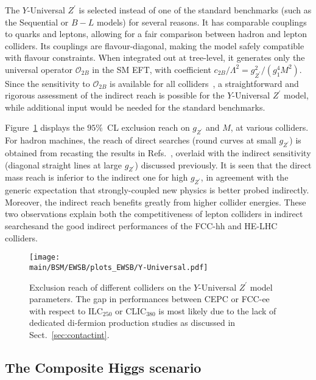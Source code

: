 \documentclass[../report.tex]{subfiles}
\providecommand{\main}{..}
\begin{document}
The $Y$-Universal $Z^\prime$ is selected instead of one of the standard benchmarks (such as the Sequential or $B-L$ models) for several reasons. It has comparable couplings to quarks and leptons, allowing for a fair comparison between hadron and lepton colliders. Its couplings are flavour-diagonal, making the model safely compatible with flavour constraints. When integrated out at tree-level, it generates only the universal operator ${\mathcal{O}}_{2B}$ in the SM EFT, with coefficient ${c_{2B}}/{\Lambda^2}={g_{Z^\prime}^2}/{(g_1^4 M^2)}$.  Since the sensitivity to ${\mathcal{O}}_{2B}$ is available for all colliders~\cite{deBlas:2019rxi}, a straightforward and rigorous assessment of the indirect reach is possible for the $Y$-Universal $Z^\prime$ model, while additional input would be needed for the standard benchmarks.

Figure~\ref{fig:Universal_Zp} displays the $95\%$~CL exclusion reach on $g_{Z^\prime}$ and $M$, at various colliders. For hadron machines, the reach of direct searches (round curves at small $g_{Z^\prime}$) is obtained from recasting the results in Refs.~\cite{CidVidal:2018eel,Jamin:2019mqx}, overlaid with the indirect sensitivity (diagonal straight lines at large $g_{Z^\prime}$) discussed previously. It is seen that the direct mass reach is inferior to the indirect one for high $g_{Z^\prime}$, in agreement with the generic expectation that strongly-coupled new physics is better probed indirectly. Moreover, the indirect reach  benefits greatly from higher collider energies. These two observations explain both the competitiveness of lepton colliders in indirect searchesand  the good indirect performances of the FCC-hh and HE-LHC colliders.

\begin{figure}[t]
    \centering
    \texttt{[image: \\main/BSM/EWSB/plots\_EWSB/Y-Universal.pdf]}
    \caption{Exclusion reach of different colliders on the $Y$-Universal $Z^\prime$ model parameters. The gap in performances between CEPC or FCC-ee with respect to ILC$_{250}$ or CLIC$_{380}$ is most likely due to the lack of dedicated di-fermion production studies as discussed in Sect.~\ref{sec:contactint}.}
    \label{fig:Universal_Zp}
\end{figure}

\subsection{The Composite Higgs scenario}
\end{document}
